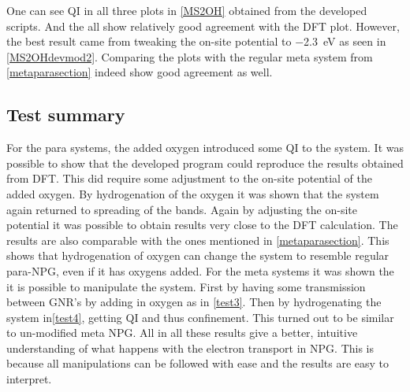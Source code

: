 One can see QI in all three plots in \cref{MS2OH} obtained from the developed scripts. And the all show relatively good agreement with the DFT plot. However, the best result came from tweaking the on-site potential to \SI{-2.3}{\electronvolt} as seen in \cref{MS2OHdevmod2}. Comparing the plots with the regular meta system from \cref{metaparasection} indeed show good agreement as well.
\subsection{Test summary}
For the para systems, the added oxygen introduced some QI to the system. It was possible to show that the developed program could reproduce the results obtained from DFT. This did require some adjustment to the on-site potential of the added oxygen. By hydrogenation of the oxygen it was shown that the system again returned to spreading of the bands. Again by adjusting the on-site potential it was possible to obtain results very close to the DFT calculation. The results are also comparable with the ones mentioned in \cref{metaparasection}. This shows that hydrogenation of oxygen can change the system to resemble regular para-NPG, even if it has oxygens added. For the meta systems it was shown the it is possible to manipulate the system. First by having some transmission between GNR's by adding in oxygen as in \cref{test3}. Then by hydrogenating the system in\cref{test4}, getting QI and thus confinement. This turned out to be similar to un-modified meta NPG.
All in all these results give a better, intuitive understanding of what happens with the electron transport in NPG. This is because all manipulations can be followed with ease and the results are easy to interpret.
